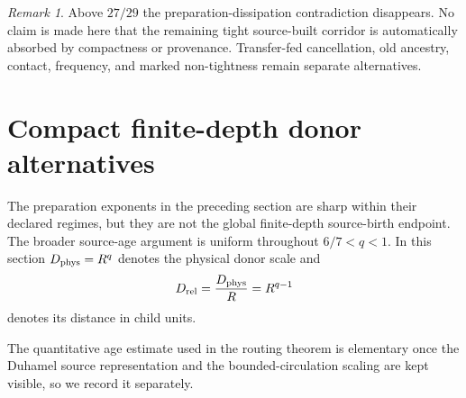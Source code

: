 \documentclass[11pt]{article}
\theoremstyle{definition}\newtheorem{definition}[theorem]{Definition}
\theoremstyle{remark}\newtheorem{remark}[theorem]{Remark}
\begin{document}
\begin{remark}
Above $27/29$ the preparation-dissipation contradiction disappears.  No claim
is made here that the remaining tight source-built corridor is automatically
absorbed by compactness or provenance.  Transfer-fed cancellation, old
ancestry, contact, frequency, and marked non-tightness remain separate
alternatives.
\end{remark}

\section{Compact finite-depth donor alternatives}
\label{sec:quniform}

The preparation exponents in the preceding section are sharp within their
declared regimes, but they are not the global finite-depth source-birth
endpoint.  The broader source-age argument is uniform throughout
$6/7<q<1$.  In this section $D_{\rm phys}=R^q$ denotes the physical donor
scale and
\[
 D_{\rm rel}=\frac{D_{\rm phys}}R=R^{q-1}
\]
denotes its distance in child units.

The quantitative age estimate used in the routing theorem is elementary once
the Duhamel source representation and the bounded-circulation scaling are kept
visible, so we record it separately.
\end{document}
